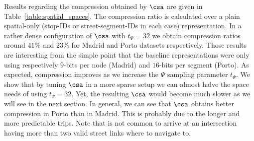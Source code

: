 Results regarding the compression obtained by $\csa$ are given in Table~\ref{table:spatial_spaces}.
The compression ratio is calculated over a plain spatial-only (stop-IDs or street-segment-IDs in each case) representation.   %
In a rather dense 
configuration of $\csa$ with $t_{\Psi}=32$ we obtain compression ratios around $41$\% and $23$\% for Madrid and Porto datasets respectively.
Those results are interesting from the simple point that the baseline representations were only using respectively 
$9$-bits per node (Madrid) and $16$-bits per segment (Porto). 
As expected, compression improves as we increase the $\Psi$ sampling parameter $t_{\Psi}$. We show that by tuning 
$\csa$ in a more sparse setup we can almost halve the space needs of using $t_{\Psi}=32$. Yet, the resulting $\csa$ would become
much slower as we will see in the next section.
In general, we can see that $\csa$ obtains better compression in Porto than in Madrid. This is probably due to the longer and
more predictable trips. Note that is not common to arrive at an intersection having more than two valid 
street links where to navigate to.


